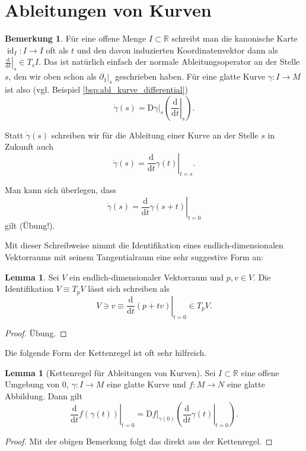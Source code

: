 \documentclass[a4paper]{scrreprt}
\numberwithin{equation}{chapter}
\newcommand{\D}{\mathrm{d}}
\newcommand{\DD}{\mathrm{D}}
\DeclareMathOperator{\id}{id}
\newcommand{\R}{\mathbb{R}}
\theoremstyle{definition}
\newtheorem{lemma}[defn]{Lemma}
\newtheorem{bem}[defn]{Bemerkung}
\newcommand{\bewUeb}{\begin{proof}Übung.\end{proof}}
\begin{document}
\section{Ableitungen von Kurven}
\begin{bem}
	Für eine offene Menge $I\subset\mathbb R$ schreibt man die kanonische Karte $\id_I\colon I \to I$ oft als $t$ und den davon induzierten Koordinatenvektor dann als $\left.\frac{\D}{\D t}\right|_s \in T_sI$. Das ist natürlich einfach der normale Ableitungsoperator an der Stelle $s$, den wir oben schon als $\left.\partial_1\right|_s$ geschrieben haben. Für eine glatte Kurve $\gamma\colon I \to M$ ist also (vgl. Beispiel \ref{bsp:abl_kurve_differential})
	\[\dot\gamma(s) = \left.\DD\gamma\right|_s \left(\left.\frac{\D}{\D t}\right|_s\right).\]

	Statt $\dot\gamma(s)$ schreiben wir für die Ableitung einer Kurve an der Stelle $s$ in Zukunft auch
	\[\dot\gamma(s) = \left.\frac{\D}{\D t}\gamma(t)\right|_{t = s}.\]

	Man kann sich überlegen, dass
	\[\dot\gamma(s) = \left.\frac{\D}{\D t}\gamma(s + t)\right|_{t = 0}\]
	gilt (Übung!).
\end{bem}
Mit dieser Schreibweise nimmt die Identifikation eines endlich-dimensionalen Vektorraums mit seinem Tangentialraum eine sehr suggestive Form an:
\begin{lemma}
	Sei $V$ ein endlich-dimensionaler Vektorraum und $p, v\in V$. Die Identifikation $V \equiv T_pV$ lässt sich schreiben als
	\[V \ni v \equiv \left.\frac{\D}{\D t}(p + tv)\right|_{t=0} \in T_pV.\]
	\bewUeb
\end{lemma}

Die folgende Form der Kettenregel ist oft sehr hilfreich.
\begin{lemma}[Kettenregel für Ableitungen von Kurven]
	Sei $I \subset\R$ eine offene Umgebung von 0, $\gamma\colon I \to M$ eine glatte Kurve und $f\colon M \to N$ eine glatte Abbildung. Dann gilt
	\[\left.\frac{\D}{\D t}f(\gamma(t))\right|_{t=0} = \left.\DD f\right|_{\gamma(0)} \left(\left.\frac{\D}{\D t}\gamma(t)\right|_{t=0}\right).\]

	\begin{proof}
		Mit der obigen Bemerkung folgt das direkt aus der Kettenregel.
	\end{proof}
\end{lemma}
\end{document}
